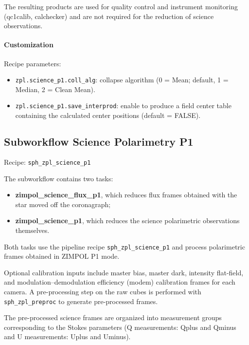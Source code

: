 The resulting products are used for quality control and instrument monitoring
(qc1calib, calchecker)
and are not required for the reduction of science observations.

\paragraph{Customization}

Recipe parameters:
\begin{itemize}
\item \texttt{zpl.science\_p1.coll\_alg}: collapse algorithm
(0 = Mean; default, 1 = Median, 2 = Clean Mean).
\item \texttt{zpl.science\_p1.save\_interprod}: enable to produce
a field center table containing the calculated center positions
(default = FALSE).
\end{itemize}




\subsection{Subworkflow Science Polarimetry P1}

Recipe: \texttt{sph\_zpl\_science\_p1}

The subworkflow contains two tasks:

\begin{itemize}
\item \textbf{zimpol\_science\_flux\_p1}, which reduces flux frames obtained with the star moved off the coronagraph;
\item \textbf{zimpol\_science\_p1}, which reduces the science polarimetric observations themselves.
\end{itemize}

Both tasks use the pipeline recipe \texttt{sph\_zpl\_science\_p1} and process polarimetric frames obtained in ZIMPOL P1 mode.

Optional calibration inputs include master bias, master dark, intensity flat-field, and modulation--demodulation efficiency (modem) calibration frames for each camera.
A pre-processing step on the raw cubes is performed with \texttt{sph\_zpl\_preproc} to generate pre-processed frames.

The pre-processed science frames are organized into measurement groups corresponding to the Stokes parameters
(Q measurements: Qplus and Qminus and U measurements: Uplus and Uminus).

